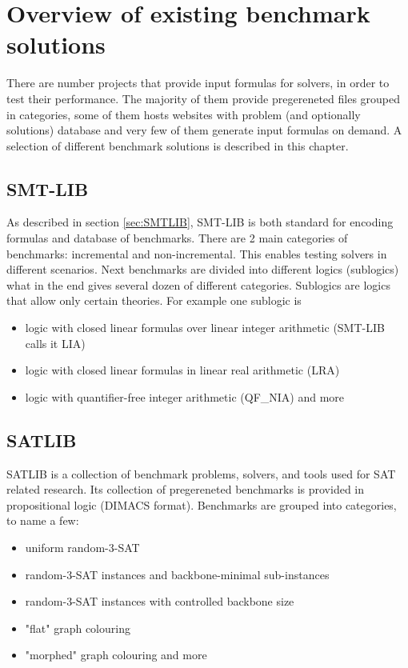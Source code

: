 \chapter{Overview of existing benchmark solutions}

There are number projects that provide input formulas for solvers, in order to test their performance. The majority of them provide pregereneted files grouped in categories, some of them hosts websites with problem (and optionally solutions) database and very few of them generate input formulas on demand. A selection of different benchmark solutions is described in this chapter.

\section{SMT-LIB}
\label{sec:SMTLIBBenchmarks}

As described in section \ref{sec:SMTLIB}, SMT-LIB is both standard for encoding formulas and database of benchmarks. There are 2 main categories of benchmarks: incremental and non-incremental. This enables testing solvers in different scenarios. Next benchmarks are divided into different logics (sublogics) what in the end gives several dozen of different categories. Sublogics are logics that allow only certain theories. For example one sublogic is 
\begin{itemize}
  \item logic with closed linear formulas over linear integer arithmetic (SMT-LIB calls it LIA)
  \item logic with closed linear formulas in linear real arithmetic (LRA) 
  \item logic with quantifier-free integer arithmetic (QF\_NIA) and more
\end{itemize}

\section{SATLIB}

SATLIB \cite{Hol00} is a collection of benchmark problems, solvers, and tools used for SAT related research. Its collection of pregereneted benchmarks is provided in propositional logic (DIMACS format). Benchmarks are grouped into categories, to name a few:
\begin{itemize}
\item uniform random-3-SAT
\item random-3-SAT instances and backbone-minimal sub-instances
\item random-3-SAT instances with controlled backbone size
\item "flat" graph colouring
\item "morphed" graph colouring and more
\end{itemize}

